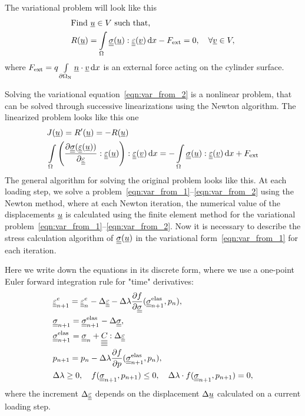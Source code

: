 \documentclass[12pt]{article}
\newcommand{\todounderline}[1]{\todo[inline, size=\scriptsize]{#1}}
\begin{document}
The variational problem will look like this 
\begin{align}
    & \text{Find } \underline{u} \in V \text{ such that,} \label{eqn:var_from_1} \\ 
    & R(\underline{u}) = \int\limits_\Omega\underline{\underline{\sigma}}(\underline{u}) : \underline{\underline{\varepsilon}}(\underline{v}) \, \mathrm{d} x - F_\text{ext} = 0, \quad \forall \underline{v} \in V \label{eqn:var_from_2},
\end{align}
where $F_\text{ext} = q\int\limits_{\partial\Omega_\text{N}}\underline{n} \cdot \underline{v} \, \mathrm{d} x$ is an external force acting on the cylinder surface.

Solving the variational equation~\ref{eqn:var_from_2} is a nonlinear
problem, that can be solved through successive linearizations using the
Newton algorithm. The linearized problem looks like this one
\begin{align}
    & J(\underline{u}) = R^\prime(\underline{u}) = -R(\underline{u}) \\
    & \int\limits_\Omega \left(\frac{\partial\underline{\underline{\sigma}}(\underline{\underline{\varepsilon}}(\underline{u}))}{\partial\underline{\underline{\varepsilon}}} : \underline{\underline{\varepsilon}}(\underline{u})\right) : \underline{\underline{\varepsilon}}(\underline{v}) \, \mathrm{d} x = -\int\limits_\Omega\underline{\underline{\sigma}}(\underline{u}) : \underline{\underline{\varepsilon}}(\underline{v}) \, \mathrm{d} x + F_\text{ext}
\end{align}
The general algorithm for solving the original problem looks like this. \todounderline{Change this paragraph} At each loading step, we solve a problem~\ref{eqn:var_from_1}--\ref{eqn:var_from_2} using the Newton method, where at each Newton iteration, the numerical value of the displacements $\underline{u}$ is calculated using the finite element method for the variational problem~\ref{eqn:var_from_1}--\ref{eqn:var_from_2}. Now it is necessary to describe the stress calculation algorithm of $\underline{\underline{\sigma}}(\underline{u})$ in the variational form~\ref{eqn:var_from_1} for each iteration.

Here we write down the equations in its discrete form, where we use a one-point Euler forward integration rule for "time" derivatives:
\begin{align}
    & \underline{\underline{\varepsilon}}_{n+1}^e = \underline{\underline{\varepsilon}}_{n}^e - \Delta\underline{\underline{\varepsilon}} - \Delta\lambda\frac{\partial f}{\partial \underline{\underline{\sigma}}}(\underline{\underline{\sigma}}_{n+1}^{\text{elas}}, p_n), \label{eqn:eps_e_disc} \\
    & \underline{\underline{\sigma}}_{n+1} = \underline{\underline{\sigma}}_{n+1}^{\text{elas}} - \Delta\underline{\underline{\sigma}}, \\
    & \underline{\underline{\sigma}}_{n+1}^{\text{elas}} = \underline{\underline{\sigma}}_n + \underline{\underline{\underline{\underline{C_{}}}}} : \Delta\underline{\underline{\varepsilon}} \\
    & p_{n+1} = p_n - \Delta\lambda\frac{\partial f}{\partial p}(\underline{\underline{\sigma}}_{n+1}^{\text{elas}}, p_n), \label{eqn:p_disc} \\
    & \Delta\lambda \geq 0, \quad f(\underline{\underline{\sigma}}_{n+1}, p_{n+1}) \leq 0, \quad \Delta\lambda\cdot f(\underline{\underline{\sigma}}_{n+1}, p_{n+1}) = 0, \label{eqn:KKT_disc}
\end{align}
where the increment $\Delta\underline{\underline{\varepsilon}}$ depends on the displacement $\Delta\underline{u}$ calculated on a current loading step.
\end{document}
